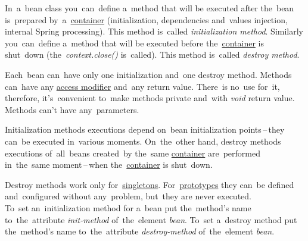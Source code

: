 In~a~bean class you~can~define a~method that will be executed after the~bean is~prepared by~a~\hyperref[springcontainrer]{container} (initialization, dependencies and~values injection, internal Spring processing).
This method is~called \textit{initialization method}.
Similarly you~can~define a~method that will be executed before the~\hyperref[springcontainrer]{container} is shut~down (the~\textit{context.close()} is~called).
This method is~called \textit{destroy method}.

Each~bean can~have only one initialization and~one destroy method.
Methods can~have any \hyperref[javaaccessmodifiers]{access modifier} and~any return value.
There~is no~use for~it, therefore, it's~convenient to~make methods private and~with \textit{void} return value.
Methods can't have any~parameters.

Initialization methods executions depend on~bean initialization points\,--\,they can~be executed in~various moments.
On~the~other hand, destroy methods executions of~all~beans created~by the~same \hyperref[springcontainrer]{container} are~performed in~the~same moment\,--\,when the~\hyperref[springcontainrer]{container} is shut~down.

\warning Destroy methods work only for~\hyperref[singletondp]{singletons}.
For~\hyperref[prototypedp]{prototypes} they can~be defined and~configured without any~problem, but~they are never executed.\\

\noindent To~set an~initialization method for a~bean put the~method's name to~the~attribute \textit{init-method} of~the~element \textit{bean}.
To~set a~destroy method put the~method's name to~the~attribute \textit{destroy-method} of~the~element \textit{bean}.
\newpage

